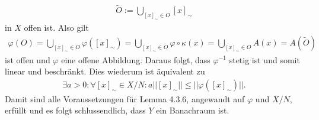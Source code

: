 \begin{solution}
\begin{enumerate}[label = (\roman*)]
\begin{align*}
     \widetilde{O} :=\bigcup_{[x]_\sim \in O} [x]_{\sim}
  \end{align*}
  in $X$ offen ist. Also gilt
  \begin{align*}
    \varphi(O) = \bigcup_{[x]_\sim \in O} \varphi([x]_{\sim})
    = \bigcup_{[x]_\sim \in O} \varphi \circ \kappa(x)
    = \bigcup_{[x]_\sim \in O} A(x)
    = A(\widetilde{O})
  \end{align*}
  ist offen und $\varphi$ eine offene Abbildung. Daraus folgt, dass $\varphi^{-1}$
  stetig ist und somit linear und beschränkt. Dies wiederum ist äquivalent zu
  \begin{align*}
    \exists a > 0: \forall [x]_\sim \in X/N: a||[x]_\sim|| \leq ||\varphi([x]_\sim)||.
  \end{align*}
  Damit sind alle Voraussetzungen für Lemma 4.3.6, angewandt auf $\varphi$ und $X/N$, erfüllt
  und es folgt schlussendlich, dass $Y$ ein Banachraum ist.
\end{enumerate}
\end{solution}

